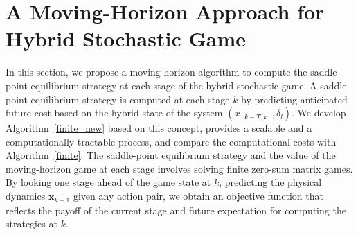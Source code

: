 \section{A Moving-Horizon Approach for Hybrid Stochastic Game}
\label{sec:algorithm}%
In this section, we propose a moving-horizon algorithm to compute the saddle-point equilibrium strategy at each stage of the hybrid stochastic game. A saddle-point equilibrium strategy is computed at each stage $k$ by predicting anticipated future cost based on the hybrid state of the system $(x_{[k-T, k]},\delta_l )$. We develop Algorithm~\ref{finite_new} based on this concept, provides a scalable and a computationally tractable process, and compare the computational costs with Algorithm~\ref{finite}. The saddle-point equilibrium strategy and the value of the moving-horizon game at each stage involves solving finite zero-sum matrix games. By looking one stage ahead of the game state at $k$, predicting the physical dynamics $\mathbf{x}_{k+1}$ given any action pair, we obtain an objective function that reflects the payoff of the current stage and future expectation for computing the strategies at $k$. %

